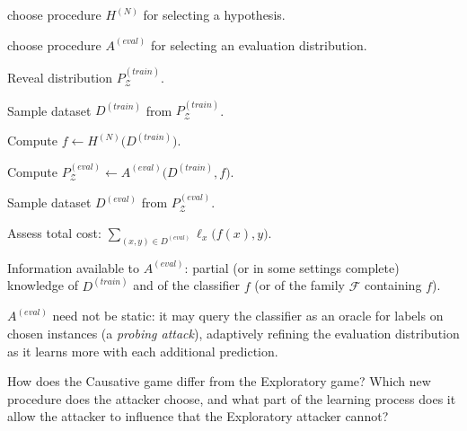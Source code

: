 \documentclass[10pt]{extarticle}
\newcommand{\resposta}[1]{\par\smallskip\noindent #1}
\begin{document}
\begin{questoes}
\resposta{
\begin{topicos}
\item[1. Defender:] choose procedure $H^{(N)}$ for selecting a hypothesis.
\item[2. Attacker:] choose procedure $A^{(eval)}$ for selecting an evaluation distribution.
\item[3. Evaluation:]
  \begin{topicos}
  \item Reveal distribution $P_{\mathcal{Z}}^{(train)}$.
  \item Sample dataset $D^{(train)}$ from $P_{\mathcal{Z}}^{(train)}$.
  \item Compute $f \leftarrow H^{(N)}\big(D^{(train)}\big)$.
  \item Compute $P_{\mathcal{Z}}^{(eval)} \leftarrow A^{(eval)}\big(D^{(train)}, f\big)$.
  \item Sample dataset $D^{(eval)}$ from $P_{\mathcal{Z}}^{(eval)}$.
  \item Assess total cost: $\displaystyle\sum_{(x,y)\in D^{(eval)}} \ell_x\big(f(x), y\big)$.
  \end{topicos}
\item Information available to $A^{(eval)}$: partial (or in some settings complete) knowledge of $D^{(train)}$ and of the classifier $f$ (or of the family $\mathcal{F}$ containing $f$).
\item $A^{(eval)}$ need not be static: it may query the classifier as an oracle for labels on chosen instances (a \emph{probing attack}), adaptively refining the evaluation distribution as it learns more with each additional prediction.
\end{topicos}
}

\item How does the Causative game differ from the Exploratory game? Which new procedure does the attacker choose, and what part of the learning process does it allow the attacker to influence that the Exploratory attacker cannot?


\end{questoes}
\end{document}

